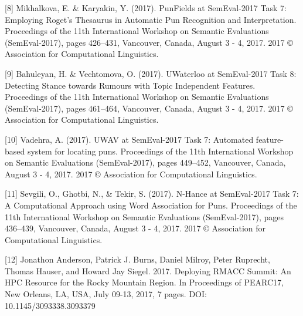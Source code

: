 \documentclass{article}
\begin{document}
[8] Mikhalkova, E. \& Karyakin, Y. (2017). PunFields at SemEval-2017 Task 7:
Employing Roget’s Thesaurus in Automatic Pun Recognition and Interpretation.
Proceedings of the 11th International Workshop on Semantic Evaluations
(SemEval-2017), pages 426–431, Vancouver, Canada, August 3 - 4, 2017. 2017 ©
Association for Computational Linguistics.

[9] Bahuleyan, H. \& Vechtomova, O. (2017). UWaterloo at SemEval-2017 Task 8:
Detecting Stance towards Rumours with Topic Independent Features. Proceedings
of the 11th International Workshop on Semantic Evaluations (SemEval-2017),
pages 461–464, Vancouver, Canada, August 3 - 4, 2017. 2017 © Association for
Computational Linguistics.

[10] Vadehra, A. (2017). UWAV at SemEval-2017 Task 7: Automated feature-based
system for locating puns. Proceedings of the 11th International Workshop on
Semantic Evaluations (SemEval-2017), pages 449–452, Vancouver, Canada, August 3
- 4, 2017. 2017 © Association for Computational Linguistics.

[11] Sevgili, O., Ghotbi, N., \& Tekir, S. (2017). N-Hance at SemEval-2017 Task
7: A Computational Approach using Word Association for Puns. Proceedings of the
11th International Workshop on Semantic Evaluations (SemEval-2017), pages
436–439, Vancouver, Canada, August 3 - 4, 2017. 2017 © Association for
Computational Linguistics.

[12] Jonathon Anderson, Patrick J. Burns, Daniel Milroy, Peter Ruprecht, Thomas Hauser, and Howard Jay Siegel. 2017. Deploying RMACC Summit: An HPC Resource for the Rocky Mountain Region. In Proceedings of PEARC17, New Orleans, LA, USA, July 09-13, 2017, 7 pages. DOI: 10.1145/3093338.3093379
\end{document}
